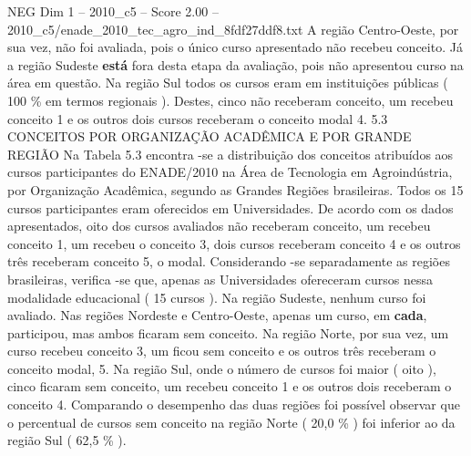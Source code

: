 \begin{textsample}{NEG Dim 1 – 2010\_c5 – Score 2.00 – 2010\_c5/enade\_2010\_tec\_agro\_ind\_8fdf27ddf8.txt}
A região Centro-Oeste, por sua vez, não foi avaliada, pois o único curso apresentado não recebeu conceito.
Já a região Sudeste \textbf{está} fora desta etapa da avaliação, pois não apresentou curso na área em questão.
Na região Sul todos os cursos eram em instituições públicas ( 100 \% em termos regionais ).
Destes, cinco não receberam conceito, um recebeu conceito 1 e os outros dois cursos receberam o conceito modal 4. 5.3 CONCEITOS POR ORGANIZAÇÃO ACADÊMICA E POR GRANDE REGIÃO Na Tabela 5.3 encontra -se a distribuição dos conceitos atribuídos aos cursos participantes do ENADE/2010 na Área de Tecnologia em Agroindústria, por Organização Acadêmica, segundo as Grandes Regiões brasileiras.
Todos os 15 cursos participantes eram oferecidos em Universidades.
De acordo com os dados apresentados, oito dos cursos avaliados não receberam conceito, um recebeu conceito 1, um recebeu o conceito 3, dois cursos receberam conceito 4 e os outros três receberam conceito 5, o modal.
Considerando -se separadamente as regiões brasileiras, verifica -se que, apenas as Universidades ofereceram cursos nessa modalidade educacional ( 15 cursos ).
Na região Sudeste, nenhum curso foi avaliado.
Nas regiões Nordeste e Centro-Oeste, apenas um curso, em \textbf{cada}, participou, mas ambos ficaram sem conceito.
Na região Norte, por sua vez, um curso recebeu conceito 3, um ficou sem conceito e os outros três receberam o conceito modal, 5.
Na região Sul, onde o número de cursos foi maior ( oito ), cinco ficaram sem conceito, um recebeu conceito 1 e os outros dois receberam o conceito 4.
Comparando o desempenho das duas regiões foi possível observar que o percentual de cursos sem conceito na região Norte ( 20,0 \% ) foi inferior ao da região Sul ( 62,5 \% ).

\end{textsample}
